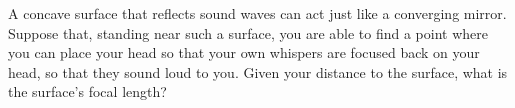 A concave surface that reflects sound waves can act
just like a converging mirror. Suppose that, standing near
such a surface, you are able to find a point where you can
place your head so that your own whispers are focused back
on your head, so that they sound loud to you. Given your
distance to the surface, what is the surface's focal length?\answercheck
